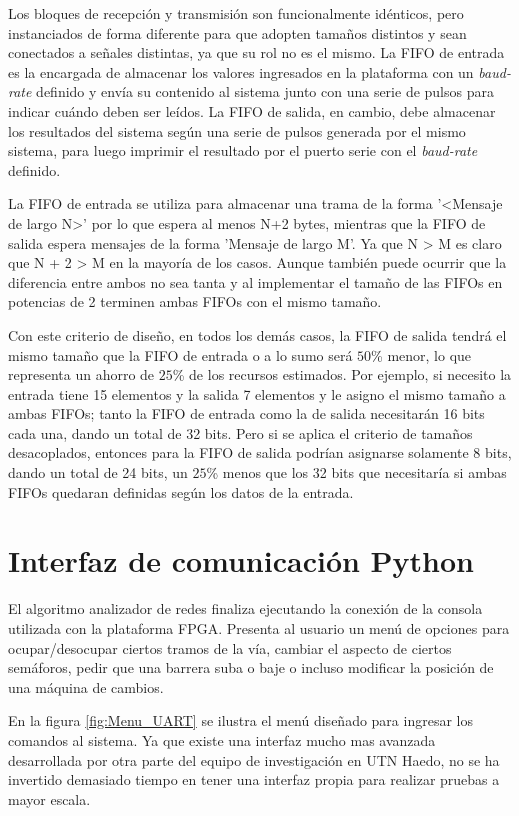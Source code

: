 		Los bloques de recepción y transmisión son funcionalmente idénticos, pero instanciados de forma diferente para que adopten tamaños distintos y sean conectados a señales distintas, ya que su rol no es el mismo. La FIFO de entrada es la encargada de almacenar los valores ingresados en la plataforma con un \textit{baud-rate} definido y envía su contenido al sistema junto con una serie de pulsos para indicar cuándo deben ser leídos. La FIFO de salida, en cambio, debe almacenar los resultados del sistema según una serie de pulsos generada por el mismo sistema, para luego imprimir el resultado por el puerto serie con el \textit{baud-rate} definido.

		La FIFO de entrada se utiliza para almacenar una trama de la forma '<Mensaje de largo N>' por lo que espera al menos N+2 bytes, mientras que la FIFO de salida espera mensajes de la forma 'Mensaje de largo M'. Ya que N > M es claro que N + 2 > M en la mayoría de los casos. Aunque también puede ocurrir que la diferencia entre ambos no sea tanta y al implementar el tamaño de las FIFOs en potencias de 2 terminen ambas FIFOs con el mismo tamaño. 

		Con este criterio de diseño, en todos los demás casos, la FIFO de salida tendrá el mismo tamaño que la FIFO de entrada o a lo sumo será $50$\% menor, lo que representa un ahorro de $25$\% de los recursos estimados. Por ejemplo, si necesito la entrada tiene 15 elementos y la salida 7 elementos y le asigno el mismo tamaño a ambas FIFOs; tanto la FIFO de entrada como la de salida necesitarán 16 bits cada una, dando un total de 32 bits. Pero si se aplica el criterio de tamaños desacoplados, entonces para la FIFO de salida podrían asignarse solamente 8 bits, dando un total de 24 bits, un $25$\% menos que los 32 bits que necesitaría si ambas FIFOs quedaran definidas según los datos de la entrada.
		
\section{Interfaz de comunicación Python}

	El algoritmo analizador de redes finaliza ejecutando la conexión de la consola utilizada con la plataforma FPGA. Presenta al usuario un menú de opciones para ocupar/desocupar ciertos tramos de la vía, cambiar el aspecto de ciertos semáforos, pedir que una barrera suba o baje o incluso modificar la posición de una máquina de cambios.
	
	En la figura \ref{fig:Menu_UART} se ilustra el menú diseñado para ingresar los comandos al sistema. Ya que existe una interfaz mucho mas avanzada desarrollada por otra parte del equipo de investigación en UTN Haedo, no se ha invertido demasiado tiempo en tener una interfaz propia para realizar pruebas a mayor escala.
	
